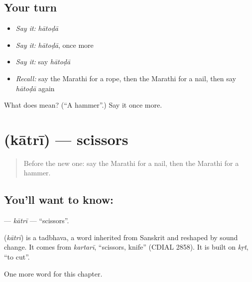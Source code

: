 \subsection*{Your turn}
\begin{itemize}
\raggedright
  \item \emph{Say it:} \emph{hātoḍā}
  \item \emph{Say it:} \emph{hātoḍā}, once more
  \item \emph{Say it:} say \emph{hātoḍā}
  \item \emph{Recall:} say the Marathi for a rope, then the Marathi for a nail, then say \emph{hātoḍā} again
\end{itemize}

\begin{tcolorbox}[breakable,colback=teal!4,colframe=teal!35!black,title={Before you move on}]
What does  mean? (\textquotedblleft{}A hammer\textquotedblright{}.) Say it once more.
\end{tcolorbox}
\section[\texorpdfstring{\mr{कात्री} (kātrī)}{कात्री (kātrī)}]{ (kātrī) — scissors}

\label{lesson:MR-C132-katri}



\begin{quote}
Before the new one: say the Marathi for a nail, then the Marathi for a hammer.
\end{quote}

\subsection*{You'll want to know: }
\textbf{} — \emph{kātrī} — \textquotedblleft{}scissors\textquotedblright{}.

\begin{cousinweb}
\textbf{} (\emph{kātrī}) is a tadbhava, a word inherited from Sanskrit and reshaped by sound change. It comes from \emph{kartarī}, \textquotedblleft{}scissors, knife\textquotedblright{} (CDIAL 2858). It is built on \emph{kṛt}, \textquotedblleft{}to cut\textquotedblright{}.
\end{cousinweb}

\begin{grammarlens}[title={What you've built}]
One more word for this chapter.
\end{grammarlens}

